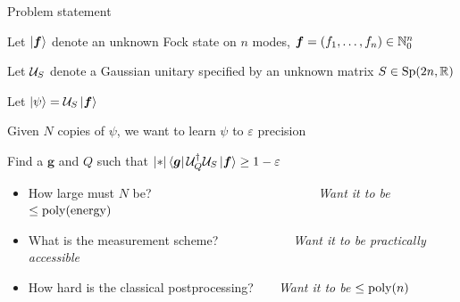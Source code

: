 \begin{frame}{Problem statement \parencite{aaronson2023efficient-tomog}}
  \begin{minipage}{.7\textwidth}
    \begin{spaceditemize}
      \item Let \(\ket{\bm f}\) denote an unknown Fock state on \(n\) modes, \(\bm f = (f_1,\dots, f_n) \in \mathbb{N}_0^n\)
      \item Let \(\mathcal{U}_S\) denote a Gaussian unitary specified by an unknown matrix \(S \in \mathrm{Sp}(2n, \mathbb{R})\)
      \item Let \(\ket{\psi} = \calU_S \ket{\bm f}\) \pause
      \item Given \(N\) copies of \(\psi\), we want to learn \(\psi\) to \(\varepsilon\) precision
      \item Find a \(\bm g\) and \(Q\) such that \(\abs*{\bra{\bm g}\calU_Q^\dag \calU_S \ket{\bm f}} \geq 1 - \varepsilon\)
    \end{spaceditemize}
  \end{minipage}
  \hfill
  \begin{minipage}{.29\textwidth}
  \end{minipage}
  \pause
  \vfill
  \begin{block}{}
    \begin{itemize}
      \item How large must \(N\) be? ~~~~~~~~~~~~~~~~~~~~~~~~~~\textit{Want it to be \(\leq \operatorname{poly}\!\left(\rm energy\right)\)}
      \item What is the measurement scheme?~~~~~~~~~~~~\textit{Want it to be practically accessible}
      \item How hard is the classical postprocessing?~~~~\textit{Want it to be \(\leq \operatorname{poly}\!\left(n\right)\)}
    \end{itemize}
  \end{block}
\end{frame}


